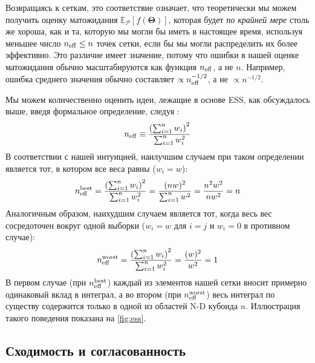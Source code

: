 \documentclass[12pt, titlepage]{article}
\newcommand{\meanwrt}[2]{\ensuremath{\mathbb{E}_{{#2}}\left[{#1}\right]}}
\newcommand{\params}{\ensuremath{\boldsymbol\Theta}}
\newcommand{\posterior}{\ensuremath{\mathcal{P}}}
\begin{document}
Возвращаясь к сеткам, это соответствие означает, что теоретически мы можем получить оценку матожидания $\meanwrt{f(\params)}{\posterior}$, которая будет \textit{по крайней мере} столь же хороша, как и та, которую мы могли бы иметь в настоящее время, используя меньшее число $n_{\rm eff} \leq n$ точек сетки, если бы мы могли распределить их более эффективно. Это различие имеет значение, потому что ошибки в нашей оценке матожидания обычно масштабируются как функция $n_{\rm eff}$, а не $n$. Например, ошибка среднего значения обычно составляет $\propto n_{\rm eff}^{-1/2}$, а не $\propto n^{-1/2}$.
	
Мы можем количественно оценить идеи, лежащие в основе ESS, как обсуждалось выше, введя формальное определение, следуя \citet{kish65}:
\begin{equation}
    n_{\rm eff} 
    \equiv \frac{\left(\sum_{i=1}^{n} w_i\right)^2}{\sum_{i=1}^{n} w_i^2}
\end{equation}
В соответствии с нашей интуицией, наилучшим случаем при таком определении является тот, в котором все веса равны ($w_i = w$):
\begin{equation}
    n_{\rm eff}^{\rm best}
    = \frac{\left(\sum_{i=1}^{n} w_i\right)^2}{\sum_{i=1}^{n} w_i^2}
    = \frac{(nw)^2}{\sum_{i=1}^{n} w^2}
    = \frac{n^2w^2}{nw^2} = n
\end{equation}
Аналогичным образом, наихудшим случаем является тот, когда весь вес сосредоточен вокруг одной выборки
($w_i = w$ для $i=j$ и $w_i=0$ в противном случае):
\begin{equation}
    n_{\rm eff}^{\rm worst}
    = \frac{\left(\sum_{i=1}^{n} w_i\right)^2}{\sum_{i=1}^{n} w_i^2}
    = \frac{(w)^2}{w^2}
    = 1
\end{equation}
В первом случае (при $n_{\rm eff}^{\rm best}$) каждый из элементов нашей сетки вносит примерно одинаковый вклад в интеграл, а во втором (при $n_{\rm eff}^{\rm worst}$) весь интеграл по существу содержится только в одной из областей N-D кубоида $n$. Иллюстрация такого поведения показана на {\color{red} \autoref{fig:ess}}.

\subsection{Сходимость и согласованность} \label{subsec:consistent}
\end{document}
